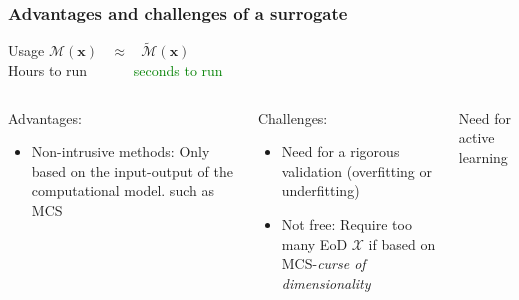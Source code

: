 \begin{frame}
\frametitle{Advantages and challenges of a surrogate}
\begin{block}{Usage}
\centering
$\mathcal{M}(\boldsymbol{x})  \ \ \ \ \approx  \ \ \ \ \tilde{\mathcal{M}}(\boldsymbol{x})$\\
\alert{Hours to run}  \ \ \ \ \ \ \textcolor{green}{seconds to run}
\end{block}

\begin{columns}
    \begin{block}{Advantages:}
    \begin{itemize}
        \item \alert{Non-intrusive methods}: Only based on the input-output of the computational model. such as MCS
    \end{itemize}
        
    \end{block}

    \begin{block}{Challenges:}
    \begin{itemize}
        \item Need for a rigorous validation (\alert{overfitting} or \alert{underfitting})
        \item \alert{Not free}: Require too many EoD $\mathcal{X}$ if based on MCS-\alert{\textit{curse of dimensionality}}
        
    \end{itemize}
        
    \end{block}  
    \begin{block}{Need for active learning}          
    \end{block}
    
    
\end{columns}


\end{frame}



